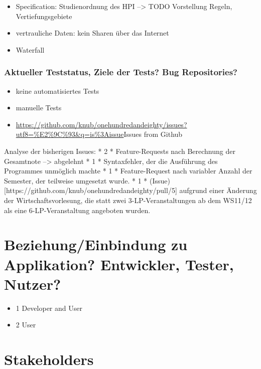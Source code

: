 \documentclass[ngerman]{article}
\begin{document}
\begin{itemize}
\itemsep1pt\parskip0pt
\item
  Specification: Studienordnung des HPI --\textgreater{} TODO
  Vorstellung Regeln, Vertiefungsgebiete
\item
  vertrauliche Daten: kein Sharen über das Internet
\item
  Waterfall
\end{itemize}

\subsubsection{Aktueller Teststatus, Ziele der Tests? Bug
Repositories?}\label{aktueller-teststatus-ziele-der-tests-bug-repositories}

\begin{itemize}
    \item
        keine automatisiertes Tests
    \item
        manuelle Tests
    \item
      \url{https://github.com/knub/onehundredandeighty/issues?utf8=\%E2\%9C\%93\&q=is\%3Aissue}{Issues from Github}
\end{itemize}

Analyse der bisherigen Issues: * 2 * Feature-Requests nach Berechnung
der Gesamtnote --\textgreater{} abgelehnt * 1 * Syntaxfehler, der die
Ausführung des Programmes unmöglich machte * 1 * Feature-Request nach
variabler Anzahl der Semester, der teilweise umgesetzt wurde. * 1 *
(Issue){[}https://github.com/knub/onehundredandeighty/pull/5{]} aufgrund
einer Änderung der Wirtschaftsvorlesung, die statt zwei
3-LP-Veranstaltungen ab dem WS11/12 als eine 6-LP-Veranstaltung
angeboten wurden.

\section{Beziehung/Einbindung zu Applikation? Entwickler, Tester, Nutzer?}

\begin{itemize}
    \item 1 Developer and User
    \item 2 User
\end{itemize}

\section{Stakeholders}
\end{document}
